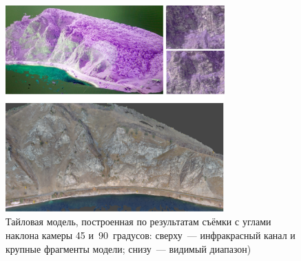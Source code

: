 \begin{figure}[H]
  \begin{center}
    \includegraphics[width=0.75\textwidth]{authors/efremov-fig3.jpg}
  \end{center}
  \caption{Тайловая модель, построенная по результатам съёмки с углами наклона камеры 45 и~90~градусов: сверху~--- инфракрасный канал и крупные фрагменты модели; снизу~--- видимый диапазон)}
  \label{fig:efremov-fig3}
\end{figure}
